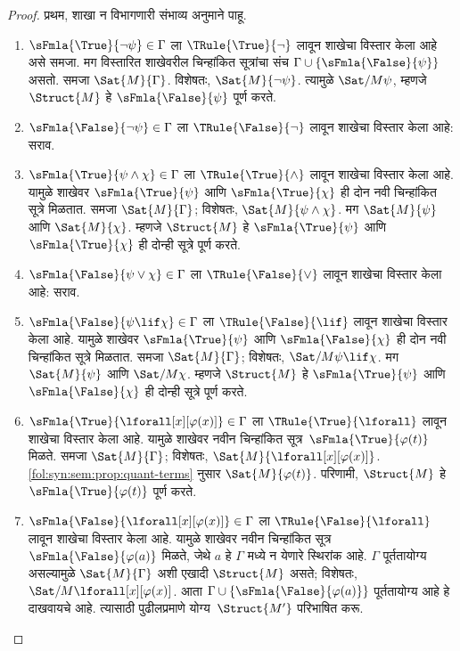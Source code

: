 \begin{proof}
प्रथम, शाखा न विभागणारी संभाव्य अनुमाने पाहू.
\begin{enumerate}
\item $\sFmla{\True}{\lnot \psi} \in \Gamma$ ला
  $\TRule{\True}{\lnot}$ लावून शाखेचा विस्तार केला आहे असे समजा. मग
  विस्तारित शाखेवरील चिन्हांकित सूत्रांचा संच $\Gamma \cup
  \{\sFmla{\False}{\psi}\}$ असतो. समजा
  $\Sat{M}{\Gamma}$. विशेषतः,
  $\Sat{M}{\lnot \psi}$. त्यामुळे
  $\Sat/{M}{\psi}$, म्हणजे
  $\Struct{M}$ हे
  $\sFmla{\False}{\psi}$ पूर्ण करते.
\item $\sFmla{\False}{\lnot \psi} \in \Gamma$ ला
  $\TRule{\False}{\lnot}$ लावून शाखेचा विस्तार केला आहे: सराव.
\item $\sFmla{\True}{\psi \land \chi} \in \Gamma$ ला
  $\TRule{\True}{\land}$ लावून शाखेचा विस्तार केला आहे. यामुळे शाखेवर
  $\sFmla{\True}{\psi}$ आणि $\sFmla{\True}{\chi}$ ही दोन नवी
  चिन्हांकित सूत्रे मिळतात. समजा
  $\Sat{M}{\Gamma}$; विशेषतः,
  $\Sat{M}{\psi \land \chi}$. मग
  $\Sat{M}{\psi}$ आणि
  $\Sat{M}{\chi}$. म्हणजे
  $\Struct{M}$ हे
  $\sFmla{\True}{\psi}$ आणि $\sFmla{\True}{\chi}$ ही दोन्ही सूत्रे पूर्ण करते.
\item $\sFmla{\False}{\psi \lor \chi} \in \Gamma$ ला
  $\TRule{\False}{\lor}$ लावून शाखेचा विस्तार केला आहे: सराव.
\item $\sFmla{\False}{\psi \lif \chi} \in \Gamma$ ला
  $\TRule{\False}{\lif}$ लावून शाखेचा विस्तार केला आहे. यामुळे शाखेवर
  $\sFmla{\True}{\psi}$ आणि $\sFmla{\False}{\chi}$ ही दोन नवी
  चिन्हांकित सूत्रे मिळतात. समजा
  $\Sat{M}{\Gamma}$; विशेषतः,
  $\Sat/{M}{\psi \lif \chi}$. मग
  $\Sat{M}{\psi}$ आणि
  $\Sat/{M}{\chi}$. म्हणजे
  $\Struct{M}$ हे
  $\sFmla{\True}{\psi}$ आणि $\sFmla{\False}{\chi}$ ही दोन्ही सूत्रे पूर्ण करते.


\item $\sFmla{\True}{\lforall[x][\varphi(x)]} \in \Gamma$ ला
  $\TRule{\True}{\lforall}$ लावून शाखेचा विस्तार केला आहे. यामुळे शाखेवर
  नवीन चिन्हांकित सूत्र~$\sFmla{\True}{\varphi(t)}$ मिळते.
  समजा $\Sat{M}{\Gamma}$; विशेषतः,
  $\Sat{M}{\lforall[x][\varphi(x)]}$.
  \ref{fol:syn:sem:prop:quant-terms} नुसार $\Sat{M}{\varphi(t)}$. परिणामी,
  $\Struct{M}$ हे $\sFmla{\True}{\varphi(t)}$ पूर्ण करते.

\item $\sFmla{\False}{\lforall[x][\varphi(x)]} \in \Gamma$ ला
  $\TRule{\False}{\lforall}$ लावून शाखेचा विस्तार केला आहे. यामुळे शाखेवर
  नवीन चिन्हांकित सूत्र~$\sFmla{\False}{\varphi(a)}$ मिळते, जेथे $a$ हे
  $\Gamma$ मध्ये न येणारे स्थिरांक आहे. $\Gamma$ पूर्ततायोग्य असल्यामुळे
  $\Sat{M}{\Gamma}$ अशी एखादी $\Struct{M}$ असते; विशेषतः,
  $\Sat/{M}{\lforall[x][\varphi(x)]}$. आता
  $\Gamma \cup \{\sFmla{\False}{\varphi(a)}\}$ पूर्ततायोग्य आहे हे दाखवायचे आहे.
  त्यासाठी पुढीलप्रमाणे योग्य~$\Struct{M'}$ परिभाषित करू.


\end{enumerate}
\end{proof}
